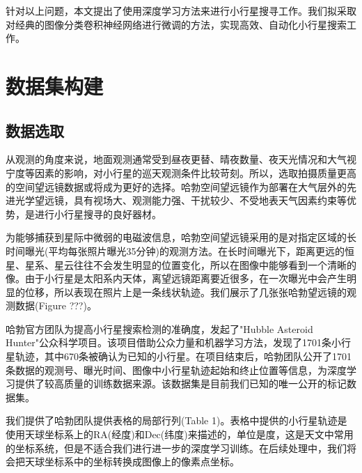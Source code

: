 \documentclass[12pt,a4paper]{article}%
\begin{document}
针对以上问题，本文提出了使用深度学习方法来进行小行星搜寻工作。我们拟采取对经典的图像分类卷积神经网络进行微调的方法，实现高效、自动化小行星搜索工作。

\section{数据集构建}

\subsection{数据选取}

从观测的角度来说，地面观测通常受到昼夜更替、晴夜数量、夜天光情况和大气视宁度等因素的影响，对小行星的巡天观测条件比较苛刻。所以，选取拍摄质量更高的空间望远镜数据或将成为更好的选择。哈勃空间望远镜作为部署在大气层外的先进光学望远镜，具有视场大、观测能力强、干扰较少、不受地表天气因素约束等优势，是进行小行星搜寻的良好器材。

为能够捕获到星际中微弱的电磁波信息，哈勃空间望远镜采用的是对指定区域的长时间曝光(平均每张照片曝光35分钟)的观测方法。在长时间曝光下，距离更远的恒星、星系、星云往往不会发生明显的位置变化，所以在图像中能够看到一个清晰的像。由于小行星是太阳系内天体，离望远镜距离要近很多，在一次曝光中会产生明显的位移，所以表现在照片上是一条线状轨迹。我们展示了几张张哈勃望远镜的观测数据(Figure ???)。

哈勃官方团队为提高小行星搜索检测的准确度，发起了"Hubble Asteroid Hunter"公众科学项目。该项目借助公众力量和机器学习方法，发现了1701条小行星轨迹，其中670条被确认为已知的小行星。在项目结束后，哈勃团队公开了1701条数据的观测号、曝光时间、图像中小行星轨迹起始和终止位置等信息，为深度学习提供了较高质量的训练数据来源。该数据集是目前我们已知的唯一公开的标记数据集。

我们提供了哈勃团队提供表格的局部行列(Table 1)。表格中提供的小行星轨迹是使用天球坐标系上的RA(经度)和Dec(纬度)来描述的，单位是度，这是天文中常用的坐标系统，但是不适合我们进行进一步的深度学习训练。在后续处理中，我们将会把天球坐标系中的坐标转换成图像上的像素点坐标。
\end{document}
